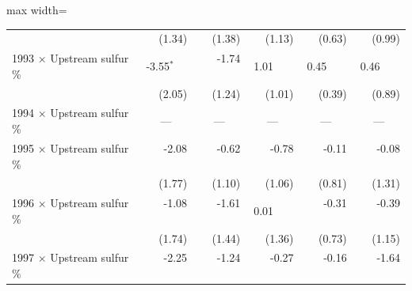 \begin{table}[htbp]
{\begin{adjustbox}{max width=\linewidth}
\begin{tabular}{lrrrrr}
 & (\phantom{-}1.34)\phantom{$^{***}$} & (\phantom{-}1.38)\phantom{$^{***}$} & (\phantom{-}1.13)\phantom{$^{***}$} & (\phantom{-}0.63)\phantom{$^{***}$} & (\phantom{-}0.99)\phantom{$^{***}$} \\
1993 $\times$ Upstream sulfur \% & \phantom{(}-3.55$^{*\phantom{*}\phantom{*}}$ & \phantom{(}-1.74$^{\phantom{*}\phantom{*}\phantom{*}}$ & \phantom{(}\phantom{-}1.01$^{\phantom{*}\phantom{*}\phantom{*}}$ & \phantom{(}\phantom{-}0.45$^{\phantom{*}\phantom{*}\phantom{*}}$ & \phantom{(}\phantom{-}0.46$^{\phantom{*}\phantom{*}\phantom{*}}$ \\
 & (\phantom{-}2.05)\phantom{$^{***}$} & (\phantom{-}1.24)\phantom{$^{***}$} & (\phantom{-}1.01)\phantom{$^{***}$} & (\phantom{-}0.39)\phantom{$^{***}$} & (\phantom{-}0.89)\phantom{$^{***}$} \\
1994 $\times$ Upstream sulfur \% & \multicolumn{1}{c}{---} & \multicolumn{1}{c}{---} & \multicolumn{1}{c}{---} & \multicolumn{1}{c}{---} & \multicolumn{1}{c}{---} \\
1995 $\times$ Upstream sulfur \% & \phantom{(}-2.08$^{\phantom{*}\phantom{*}\phantom{*}}$ & \phantom{(}-0.62$^{\phantom{*}\phantom{*}\phantom{*}}$ & \phantom{(}-0.78$^{\phantom{*}\phantom{*}\phantom{*}}$ & \phantom{(}-0.11$^{\phantom{*}\phantom{*}\phantom{*}}$ & \phantom{(}-0.08$^{\phantom{*}\phantom{*}\phantom{*}}$ \\
 & (\phantom{-}1.77)\phantom{$^{***}$} & (\phantom{-}1.10)\phantom{$^{***}$} & (\phantom{-}1.06)\phantom{$^{***}$} & (\phantom{-}0.81)\phantom{$^{***}$} & (\phantom{-}1.31)\phantom{$^{***}$} \\
1996 $\times$ Upstream sulfur \% & \phantom{(}-1.08$^{\phantom{*}\phantom{*}\phantom{*}}$ & \phantom{(}-1.61$^{\phantom{*}\phantom{*}\phantom{*}}$ & \phantom{(}\phantom{-}0.01$^{\phantom{*}\phantom{*}\phantom{*}}$ & \phantom{(}-0.31$^{\phantom{*}\phantom{*}\phantom{*}}$ & \phantom{(}-0.39$^{\phantom{*}\phantom{*}\phantom{*}}$ \\
 & (\phantom{-}1.74)\phantom{$^{***}$} & (\phantom{-}1.44)\phantom{$^{***}$} & (\phantom{-}1.36)\phantom{$^{***}$} & (\phantom{-}0.73)\phantom{$^{***}$} & (\phantom{-}1.15)\phantom{$^{***}$} \\
1997 $\times$ Upstream sulfur \% & \phantom{(}-2.25$^{\phantom{*}\phantom{*}\phantom{*}}$ & \phantom{(}-1.24$^{\phantom{*}\phantom{*}\phantom{*}}$ & \phantom{(}-0.27$^{\phantom{*}\phantom{*}\phantom{*}}$ & \phantom{(}-0.16$^{\phantom{*}\phantom{*}\phantom{*}}$ & \phantom{(}-1.64$^{\phantom{*}\phantom{*}\phantom{*}}$ \\

\end{tabular}
\end{adjustbox}}
\end{table}
